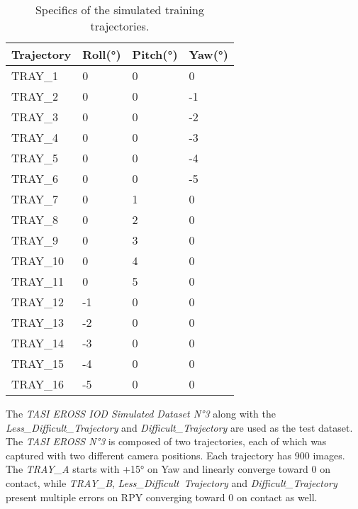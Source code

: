 \begin{table}[H]
\caption{Specifics of the simulated training trajectories.}
\label{tab:trajectories}
\centering
\begin{tabular}{l | l l l}
\toprule
Trajectory & Roll(°) & Pitch(°) & Yaw(°)\\
\midrule
TRAY\_1 & 0 & 0 & 0\\
TRAY\_2 & 0 & 0 & -1\\
TRAY\_3 & 0 & 0 & -2\\
TRAY\_4 & 0 & 0 & -3\\
TRAY\_5 & 0 & 0 & -4\\
TRAY\_6 & 0 & 0 & -5\\
TRAY\_7 & 0 & 1 & 0\\
TRAY\_8 & 0 & 2 & 0\\
TRAY\_9 & 0 & 3 & 0\\
TRAY\_10 & 0 & 4 & 0\\
TRAY\_11 & 0 & 5 & 0\\
TRAY\_12 & -1 & 0 & 0\\
TRAY\_13 & -2 & 0 & 0\\
TRAY\_14 & -3 & 0 & 0\\
TRAY\_15 & -4 & 0 & 0\\
TRAY\_16 & -5 & 0 & 0\\
\bottomrule
\end{tabular}
\end{table}

The \textit{TASI EROSS IOD Simulated Dataset N°3} along with the \textit{Less\_Difficult\_Trajectory} and \textit{Difficult\_Trajectory} are used as the test dataset. The \textit{TASI EROSS N°3} is composed of two trajectories, each of which was captured with two different camera positions. Each trajectory has 900 images.\\
The \textit{TRAY\_A} starts with +15° on Yaw and linearly converge toward 0 on contact, while \textit{TRAY\_B}, \textit{Less\_Difficult\ Trajectory} and \textit{Difficult\_Trajectory} present multiple errors on RPY converging toward 0 on contact as well.

